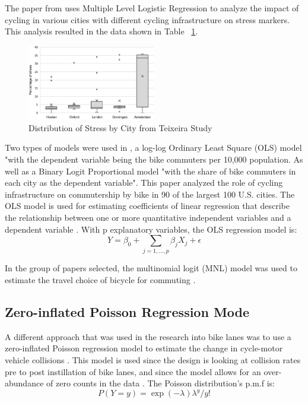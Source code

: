 \documentclass[12pt, letterpaper]{article}
\begin{document}
The paper from \citet{3Teixeira2020} uses Multiple Level Logistic Regression to analyze the impact of cycling in various cities with different cycling infrastructure on stress markers. This analysis resulted in the data shown in Table ~\ref{fig:stress}.
\begin{figure}[tbp]
    \centering
    \includegraphics[width=0.5\textwidth]{stresstable2.jpeg}
    \caption{Distribution of Stress by City from Teixeira Study}
    \label{fig:stress}
\end{figure}

Two types of models were used in \citet{4Buehler2011}, a log-log Ordinary Least Square (OLS) model "with the dependent variable being the bike commuters per 10,000 population. As well as a Binary Logit Proportional model "with the share of bike commuters in each city as the dependent variable". This paper analyzed the role of cycling infrastructure on commutership by bike in 90 of the largest 100 U.S. cities. The OLS model is used for estimating coefficients of linear regression that describe the relationship between one or more quantitative independent variables and a dependent variable \cite{XLSTAT2023}. With p explanatory variables, the OLS regression model is: 
\[Y = \beta_{0}+\sum_{j=1,\dots, p}{\beta_{j}X_{j}}+\epsilon\]

In the group of papers selected, the multinomial logit (MNL) model was used to estimate the travel choice of bicycle for commuting \cite{10Zhao2013}. 

\subsection{Zero-inflated Poisson Regression Mode}
\label{sec:pois}

A different approach that was used in the research into bike lanes was to use a zero-inflated Poisson regression model to estimate the change in cycle-motor vehicle collisions \cite{8Bhatia2016}. This model is used since the design is looking at collision rates pre to post instillation of bike lanes, and since the model allows for an over-abundance of zero counts in the data \cite{Giles2010}. The Poisson distribution's p.m.f is:
\[P(Y=y) = \exp{(-\lambda)\lambda^{y}}/y!\]
\end{document}
